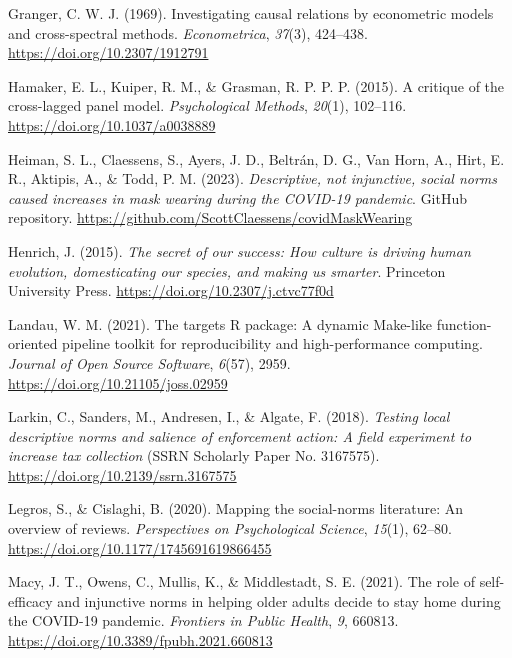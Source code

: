 \documentclass[
  man, donotrepeattitle,mask,floatsintext]{apa6}
\newlength{\cslhangindent}
\newlength{\cslentryspacingunit} %
\newenvironment{CSLReferences}[2] %
 {%
  \setlength{\parindent}{0pt}
  \ifodd #1
  \let\oldpar\par
  \def\par{\hangindent=\cslhangindent\oldpar}
  \fi
  \setlength{\parskip}{#2\cslentryspacingunit}
 }%
 {}
\begin{document}
\begin{CSLReferences}{1}{0}
\leavevmode{}%
Granger, C. W. J. (1969). Investigating causal relations by econometric models and cross-spectral methods. \emph{Econometrica}, \emph{37}(3), 424--438. \url{https://doi.org/10.2307/1912791}

\leavevmode{}%
Hamaker, E. L., Kuiper, R. M., \& Grasman, R. P. P. P. (2015). A critique of the cross-lagged panel model. \emph{Psychological Methods}, \emph{20}(1), 102--116. \url{https://doi.org/10.1037/a0038889}

\leavevmode{}%
Heiman, S. L., Claessens, S., Ayers, J. D., Beltrán, D. G., Van Horn, A., Hirt, E. R., Aktipis, A., \& Todd, P. M. (2023). \emph{Descriptive, not injunctive, social norms caused increases in mask wearing during the COVID-19 pandemic}. GitHub repository. \url{https://github.com/ScottClaessens/covidMaskWearing}

\leavevmode{}%
Henrich, J. (2015). \emph{The secret of our success: How culture is driving human evolution, domesticating our species, and making us smarter}. Princeton University Press. \url{https://doi.org/10.2307/j.ctvc77f0d}

\leavevmode{}%
Landau, W. M. (2021). The targets {R} package: A dynamic {M}ake-like function-oriented pipeline toolkit for reproducibility and high-performance computing. \emph{Journal of Open Source Software}, \emph{6}(57), 2959. \url{https://doi.org/10.21105/joss.02959}

\leavevmode{}%
Larkin, C., Sanders, M., Andresen, I., \& Algate, F. (2018). \emph{Testing local descriptive norms and salience of enforcement action: A field experiment to increase tax collection} (SSRN Scholarly Paper No. 3167575). \url{https://doi.org/10.2139/ssrn.3167575}

\leavevmode{}%
Legros, S., \& Cislaghi, B. (2020). Mapping the social-norms literature: An overview of reviews. \emph{Perspectives on Psychological Science}, \emph{15}(1), 62--80. \url{https://doi.org/10.1177/1745691619866455}

\leavevmode{}%
Macy, J. T., Owens, C., Mullis, K., \& Middlestadt, S. E. (2021). The role of self-efficacy and injunctive norms in helping older adults decide to stay home during the {COVID-19} pandemic. \emph{Frontiers in Public Health}, \emph{9}, 660813. \url{https://doi.org/10.3389/fpubh.2021.660813}


\end{CSLReferences}
\end{document}
